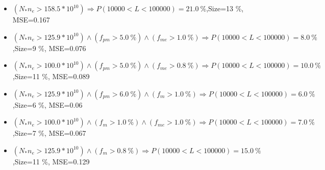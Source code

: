 \documentclass[numbered]{CSL}
\begin{document}
\begin{itemize}
\item $(N_* n_e > 158.5 * 10^{10}) \Rightarrow P(10 000 < L < 100 000) = 21.0~\%$,\hfill Size=13 \%, MSE=0.167
\item $(N_* n_e > 125.9 * 10^{10}) \land (f_{pm} > 5.0~\%) \land (f_{me} > 1.0~\%) \Rightarrow P(10 000 < L < 100 000) = 8.0~\%$,\hfill Size=9 \%, MSE=0.076
\item $(N_* n_e > 100.0 * 10^{10}) \land (f_{pm} > 5.0~\%) \land (f_{me} > 0.8~\%) \Rightarrow P(10 000 < L < 100 000) = 10.0~\%$,\hfill Size=11 \%, MSE=0.089
\item $(N_* n_e > 125.9 * 10^{10}) \land (f_{pm} > 6.0~\%) \land (f_m > 1.0~\%) \Rightarrow P(10 000 < L < 100 000) = 6.0~\%$,\hfill Size=6 \%, MSE=0.06
\item $(N_* n_e > 100.0 * 10^{10}) \land (f_m > 1.0~\%) \land (f_{me} > 1.0~\%) \Rightarrow P(10 000 < L < 100 000) = 7.0~\%$,\hfill Size=7 \%, MSE=0.067
\item $(N_* n_e > 125.9 * 10^{10}) \land (f_m > 0.8~\%) \Rightarrow P(10 000 < L < 100 000) = 15.0~\%$,\hfill Size=11 \%, MSE=0.129
\end{itemize}
\end{document}
